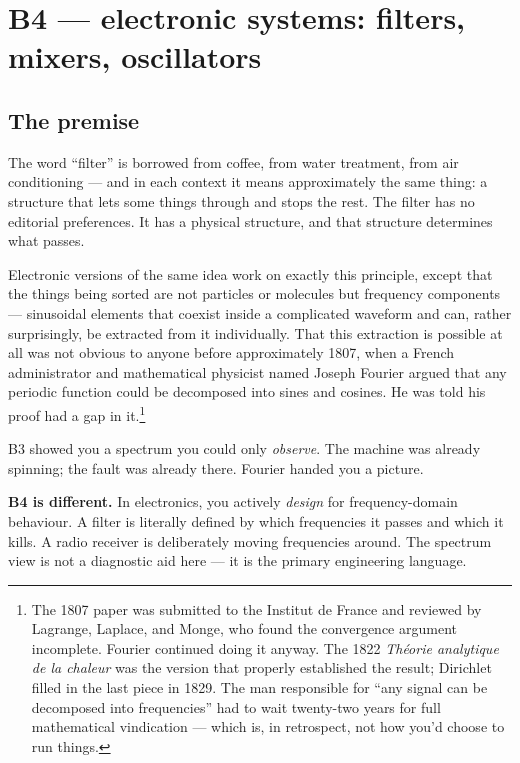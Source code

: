 \documentclass[11pt,a4paper,openany]{book}
\begin{document}
\chapter{B4 --- electronic systems: filters, mixers, oscillators}
\label{ch:b4}

\section{The premise}

The word ``filter'' is borrowed from coffee, from water treatment, from air
conditioning --- and in each context it means approximately the same thing:
a structure that lets some things through and stops the rest. The filter has
no editorial preferences. It has a physical structure, and that structure
determines what passes.

Electronic versions of the same idea work on exactly this principle, except
that the things being sorted are not particles or molecules but frequency
components --- sinusoidal elements that coexist inside a complicated waveform
and can, rather surprisingly, be extracted from it individually. That this
extraction is possible at all was not obvious to anyone before approximately
1807, when a French administrator and mathematical physicist named Joseph
Fourier argued that any periodic function could be decomposed into sines and
cosines. He was told his proof had a gap in it.\footnote{The 1807 paper was
submitted to the Institut de France and reviewed by Lagrange, Laplace, and
Monge, who found the convergence argument incomplete. Fourier continued doing
it anyway. The 1822 \emph{Th\'{e}orie analytique de la chaleur} was the
version that properly established the result; Dirichlet filled in the last
piece in 1829. The man responsible for ``any signal can be decomposed into
frequencies'' had to wait twenty-two years for full mathematical vindication
--- which is, in retrospect, not how you'd choose to run things.}

B3 showed you a spectrum you could only \emph{observe}. The machine was
already spinning; the fault was already there. Fourier handed you a picture.

\textbf{B4 is different.} In electronics, you actively \emph{design} for
frequency-domain behaviour. A filter is literally defined by which frequencies
it passes and which it kills. A radio receiver is deliberately moving
frequencies around. The spectrum view is not a diagnostic aid here --- it is
the primary engineering language.
\end{document}
